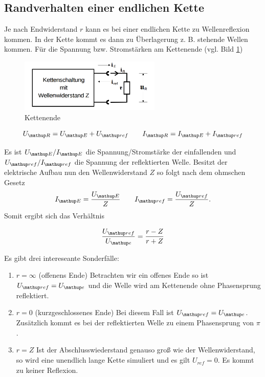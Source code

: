 \subsection{Randverhalten einer endlichen Kette}
Je nach Endwiderstand $r$ kann es bei einer endlichen Kette
zu Wellenreflexion kommen. In der Kette kommt es dann %
zu Überlagerung z. B. stehende Wellen kommen. %
Für die Spannung bzw. Stromstärken am Kettenende (vgl. Bild \ref{fig:kettenende}) %

\begin{figure}
  \centering
  \includegraphics[width=0.6\textwidth]{bilder/wellenwiderstand.png}
  \caption{Kettenende}
  \label{fig:kettenende}
\end{figure}

\begin{equation*}
U\ua{R}=U\ua{E}+U\ua{ref} \qquad I\ua{R}=I\ua{E}+I\ua{ref}
\end{equation*}

Es ist $U\ua{E}/I\ua{E}$ die Spannung/Stromstärke der einfallenden und $U\ua{ref}/I\ua{ref}$ die Spannung der reflektierten
Welle. Besitzt der elektrische Aufbau nun den Wellenwiderstand $Z$ so folgt nach dem
ohmschen Gesetz
\begin{equation*}
I\ua{E}=\frac{U\ua{E}}{Z} \qquad I\ua{ref}=\frac{U\ua{ref}}{Z}.
\end{equation*}
Somit ergibt sich das Verhältnis

\begin{equation*}
\frac{U\ua{ref}}{U\ua{e}}=\frac{r-Z}{r+Z}
\end{equation*}

Es gibt drei intereseante Sonderfälle:

\renewcommand{\labelenumi}{\alph{enumi})}
\begin{enumerate}
\item{ $r=\infty$ (offenens Ende) \newline
Betrachten wir ein offenes Ende so ist $U\ua{ref}=U\ua{e}$ und die Welle wird am Kettenende ohne Phasensprung reflektiert.} %
\item{ $r=0$ (kurzgeschlossenes Ende) \newline
Bei diesem Fall ist $U\ua{ref}=U\ua{e}$. Zusätzlich kommt es bei der reflektierten Welle zu einem Phasensprung von $\pi$.} %
\item{ $r=Z$ \newline
Ist der Abschlusswiederstand genauso groß wie der Wellenwiderstand, so wird eine unendlich lange Kette simuliert und
es gilt $U_{ref}=0$. Es kommt zu keiner Reflexion.}
\end{enumerate}

